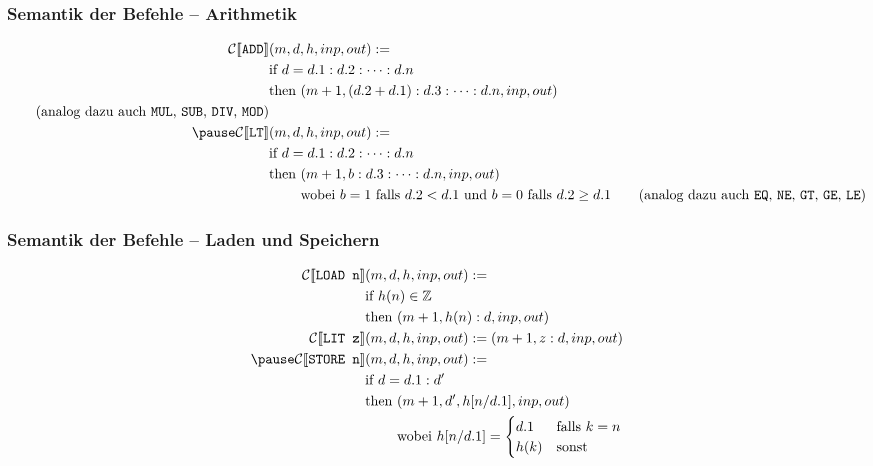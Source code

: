 \documentclass{beamer}
\begin{document}

\begin{frame} \frametitle{Semantik der Befehle -- Arithmetik}
	\small
	\begin{align*}
		\mathcal{C} [\![ \texttt{ADD} ]\!] &(m,d,h,inp,out) \defeq  \\
		&\text{if } d = d.1 : d.2 : \dots : d.n \\
		&\text{then } (m+1, (d.2 + d.1) : d.3 : \dots : d.n, inp, out) \\ 
		\tag{analog dazu auch \texttt{MUL}, \texttt{SUB}, \texttt{DIV}, \texttt{MOD}} \\ \pause
		\mathcal{C} [\![ \texttt{LT} ]\!] &(m,d,h,inp,out) \defeq  \\
		&\text{if } d = d.1 : d.2 : \dots : d.n \\
		&\text{then } (m+1, b : d.3 : \dots : d.n, inp, out) \\
		&\phantom{\text{then }} \text{wobei } b = 1 \text{ falls } d.2 < d.1 \text{ und } b = 0 \text{ falls } d.2 \ge d.1
		\tag{analog dazu auch \texttt{EQ}, \texttt{NE}, \texttt{GT}, \texttt{GE}, \texttt{LE}} 
	\end{align*}
\end{frame}


\begin{frame} \frametitle{Semantik der Befehle -- Laden und Speichern}
	\small
	\begin{align*}
		\mathcal{C} [\![ \texttt{LOAD n} ]\!] &(m,d,h,inp,out) \defeq  \\
		&\text{if } h(n) \in \Z  \\
		&\text{then } (m+1, h(n) : d, inp, out) \\
		\mathcal{C} [\![ \texttt{LIT z} ]\!] &(m,d,h,inp,out) \defeq  (m+1, z : d, inp, out) \\ \pause
		\mathcal{C} [\![ \texttt{STORE n} ]\!] &(m,d,h,inp,out) \defeq  \\
		&\text{if } d = d.1 : d' \\
		&\text{then } (m+1, d', h[n/d.1], inp, out) \\
		&\phantom{\text{then }} \text{wobei } h[n/d.1] = \begin{cases} d.1 &\text{falls } k = n \\ h(k) &\text{sonst} \end{cases}
	\end{align*}
\end{frame}
\end{document}
